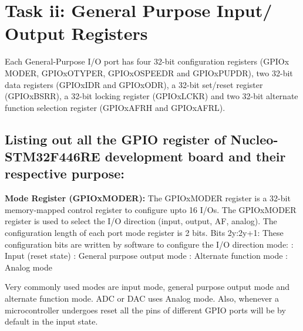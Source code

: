 \documentclass{article}
\begin{document}
\section{Task ii: General Purpose Input/ Output Registers}

Each General-Purpose I/O port has four 32-bit configuration registers (GPIOx \textunderscore MODER, GPIOx\textunderscore OTYPER, GPIOx\textunderscore OSPEEDR and GPIOx\textunderscore PUPDR), two 32-bit data registers (GPIOx\textunderscore IDR and GPIOx\textunderscore ODR), a 32-bit set/reset register (GPIOx\textunderscore BSRR), a 32-bit locking register (GPIOx\textunderscore LCKR) and two 32-bit alternate function selection register (GPIOx\textunderscore AFRH and GPIOx\textunderscore AFRL).

\subsection{Listing out all the GPIO register of Nucleo-STM32F446RE development board and their respective purpose:}

\textbf{Mode Register (GPIOx\textunderscore MODER): } The GPIOx\textunderscore MODER register is a 32-bit memory-mapped control register to configure upto 16 I/Os. The GPIOx\textunderscore MODER register is used to select the I/O direction (input, output, AF, analog). The configuration length of each port mode register is 2 bits.\newline\newline
Bits 2y:2y+1: \newline\newline
These configuration bits are written by software to configure the I/O direction mode: \newline{}: Input (reset state) \newline{}: General purpose output mode \newline{}: Alternate function mode \newline{}: Analog mode \newline\newline

Very commonly used modes are input mode, general purpose output mode and alternate function mode. ADC or DAC uses Analog mode. Also, whenever a microcontroller undergoes reset all the pins of different GPIO ports will be by default in the input state. \newline\newline
\end{document}
